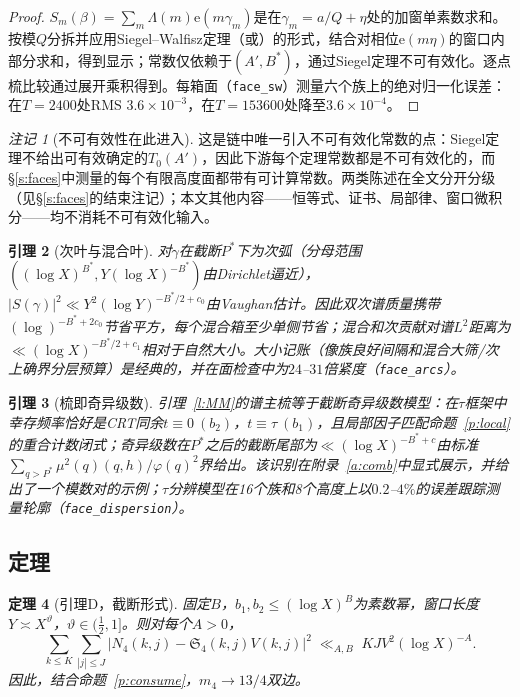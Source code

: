 \documentclass[11pt]{article}
\numberwithin{equation}{section}
\newtheorem{theorem}{定理}[section]
\newtheorem{lemma}[theorem]{引理}
\theoremstyle{definition}
\theoremstyle{remark}
\newtheorem{remark}[theorem]{注记}
\newcommand{\LL}{\Lambda}
\newcommand{\SSS}{\mathfrak{S}}
\newcommand{\e}{\mathrm{e}}
\begin{document}
\begin{proof}
$S_m(\beta)=\sum_m\LL(m)\e(m\gamma_m)$是在$\gamma_m=a/Q+\eta$处的加窗单素数求和。按模$Q$分拆并应用Siegel--Walfisz定理\cite[\S22]{Dav}（或\cite[推论5.29]{IK}）的形式，结合对相位$\e(m\eta)$的窗口内部分求和，得到显示；常数仅依赖于$(A',B^{*})$，通过Siegel定理不可有效化。逐点梳比较通过展开乘积得到。每箱面（\texttt{face\_sw}）测量六个族上的绝对归一化误差：在$T=2400$处RMS $3.6\times10^{-3}$，在$T=153600$处降至$3.6\times10^{-4}$。
\end{proof}

\begin{remark}[不可有效性在此进入]\label{r:ineffective}
这是链中唯一引入不可有效化常数的点：Siegel定理不给出可有效确定的$T_0(A')$，因此下游每个定理常数都是不可有效化的，而\S\ref{s:faces}中测量的每个有限高度面都带有可计算常数。两类陈述在全文分开分级（见\S\ref{s:faces}的结束注记）；本文其他内容——恒等式、证书、局部律、窗口微积分——均不消耗不可有效化输入。
\end{remark}

\begin{lemma}[次叶与混合叶]\label{l:minor}
对$\gamma$在截断$P^{*}$下为次弧（分母范围$((\log X)^{B^{*}},Y(\log X)^{-B^{*}})$由Dirichlet逼近），$|S(\gamma)|^{2}\ll Y^{2}(\log Y)^{-B^{*}/2+c_0}$由Vaughan估计。因此双次谱质量携带$(\log)^{-B^{*}+2c_0}$节省平方，每个混合箱至少单侧节省；混合和次贡献对谱$L^2$距离为$\ll(\log X)^{-B^{*}/2+c_1}$相对于自然大小。大小记账（像族良好间隔和混合大筛/次上确界分层预算）是经典的，并在面检查中为$24$--$31$倍紧度（\texttt{face\_arcs}）。
\end{lemma}

\begin{lemma}[梳即奇异级数]\label{l:comb}
引理~\ref{l:MM}的谱主梳等于截断奇异级数模型：在$\tau$框架中幸存频率恰好是CRT同余$t\equiv0\ (b_2)$，$t\equiv\tau\ (b_1)$，且局部因子匹配命题~\ref{p:local}的重合计数闭式；奇异级数在$P^{*}$之后的截断尾部为$\ll(\log X)^{-B^{*}+c}$由标准$\sum_{q>P^{*}}\mu^{2}(q)(q,h)/\varphi(q)^{2}$界给出。该识别在附录~\ref{a:comb}中显式展示，并给出了一个模数对的示例；$\tau$分辨模型在16个族和8个高度上以$0.2$--$4\%$的误差跟踪测量轮廓（\texttt{face\_dispersion}）。
\end{lemma}

\subsection{定理}

\begin{theorem}[引理D，截断形式]\label{t:D}
固定$B$，$b_1,b_2\le(\log X)^{B}$为素数幂，窗口长度$Y\asymp X^{\vartheta}$，$\vartheta\in(\tfrac12,1]$。则对每个$A>0$，
\[
\sum_{k\le K}\sum_{|j|\le J}
\bigl|N_4(k,j)-\SSS_4(k,j)V(k,j)\bigr|^{2}
\;\ll_{A,B}\;KJV^{2}(\log X)^{-A}.
\]
因此，结合命题~\ref{p:consume}，$m_4\to13/4$双边。
\end{theorem}
\end{document}
